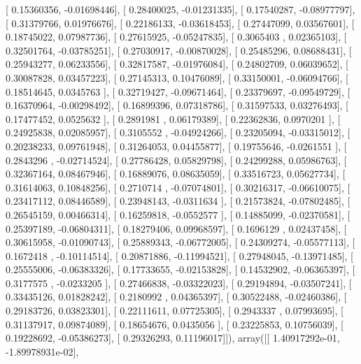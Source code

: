 \documentclass{article}
\begin{document}
       [ 0.15360356, -0.01698446],
       [ 0.28400025, -0.01231335],
       [ 0.17540287, -0.08977797],
       [ 0.31379766,  0.01976676],
       [ 0.22186133, -0.03618453],
       [ 0.27447099,  0.03567601],
       [ 0.18745022,  0.07987736],
       [ 0.27615925, -0.05247835],
       [ 0.3065403 ,  0.02365103],
       [ 0.32501764, -0.03785251],
       [ 0.27030917, -0.00870028],
       [ 0.25485296,  0.08688431],
       [ 0.25943277,  0.06233556],
       [ 0.32817587, -0.01976084],
       [ 0.24802709,  0.06039652],
       [ 0.30087828,  0.03457223],
       [ 0.27145313,  0.10476089],
       [ 0.33150001, -0.06094766],
       [ 0.18514645,  0.0345763 ],
       [ 0.32719427, -0.09671464],
       [ 0.23379697, -0.09549729],
       [ 0.16370964, -0.00298492],
       [ 0.16899396,  0.07318786],
       [ 0.31597533,  0.03276493],
       [ 0.17477452,  0.0525632 ],
       [ 0.2891981 ,  0.06179389],
       [ 0.22362836,  0.0970201 ],
       [ 0.24925838,  0.02085957],
       [ 0.3105552 , -0.04924266],
       [ 0.23205094, -0.03315012],
       [ 0.20238233,  0.09761948],
       [ 0.31264053,  0.04455877],
       [ 0.19755646, -0.0261551 ],
       [ 0.2843296 , -0.02714524],
       [ 0.27786428,  0.05829798],
       [ 0.24299288,  0.05986763],
       [ 0.32367164,  0.08467946],
       [ 0.16889076,  0.08635059],
       [ 0.33516723,  0.05627734],
       [ 0.31614063,  0.10848256],
       [ 0.2710714 , -0.07074801],
       [ 0.30216317, -0.06610075],
       [ 0.23417112,  0.08446589],
       [ 0.23948143, -0.0311634 ],
       [ 0.21573824, -0.07802485],
       [ 0.26545159,  0.00466314],
       [ 0.16259818, -0.0552577 ],
       [ 0.14885099, -0.02370581],
       [ 0.25397189, -0.06804311],
       [ 0.18279406,  0.09968597],
       [ 0.1696129 ,  0.02437458],
       [ 0.30615958, -0.01090743],
       [ 0.25889343, -0.06772005],
       [ 0.24309274, -0.05577113],
       [ 0.1672418 , -0.10114514],
       [ 0.20871886, -0.11994521],
       [ 0.27948045, -0.13971485],
       [ 0.25555006, -0.06383326],
       [ 0.17733655, -0.02153828],
       [ 0.14532902, -0.06365397],
       [ 0.3177575 , -0.0233205 ],
       [ 0.27466838, -0.03322023],
       [ 0.29194894, -0.03507241],
       [ 0.33435126,  0.01828242],
       [ 0.2180992 ,  0.04365397],
       [ 0.30522488, -0.02460386],
       [ 0.29183726,  0.03823301],
       [ 0.22111611,  0.07725305],
       [ 0.2943337 ,  0.07993695],
       [ 0.31137917,  0.09874089],
       [ 0.18654676,  0.0435056 ],
       [ 0.23225853,  0.10756039],
       [ 0.19228692, -0.05386273],
       [ 0.29326293,  0.11196017]]), array([[  1.40917292e-01,  -1.89978931e-02],
\end{document}
